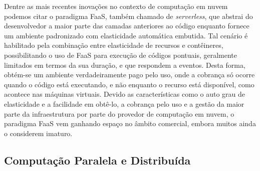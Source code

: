 \documentclass[english,brazilian]{UNISINOSmonografia} %
\begin{document}
Dentre as mais recentes inovações no contexto de computação em nuvem podemos citar o paradigma FaaS, também chamado de \textit{serverless}, que abstrai do desenvolvedor a maior parte das camadas anteriores ao código enquanto fornece um ambiente padronizado com elasticidade automática embutida.
Tal cenário é habilitado pela combinação entre elasticidade de recursos e contêineres, possibilitando o uso de FaaS para execução de códigos pontuais, geralmente limitados em termos da sua duração, e que respondem a eventos.
Desta forma, obtém-se um ambiente verdadeiramente pago pelo uso, onde a cobrança só ocorre quando o código está executando, e não enquanto o recurso está disponível, como acontece nas máquinas virtuais.
Devido as características como o auto grau de elasticidade e a facilidade em obtê-lo, a cobrança pelo uso e a gestão da maior parte da infraestrutura por parte do provedor de computação em nuvem, o paradigma FaaS vem ganhando espaço no âmbito comercial, embora muitos ainda o considerem imaturo.


\subsection{Computação Paralela e Distribuída}
\label{fundamentacao-computacao-distribuida}


%





\end{document}
